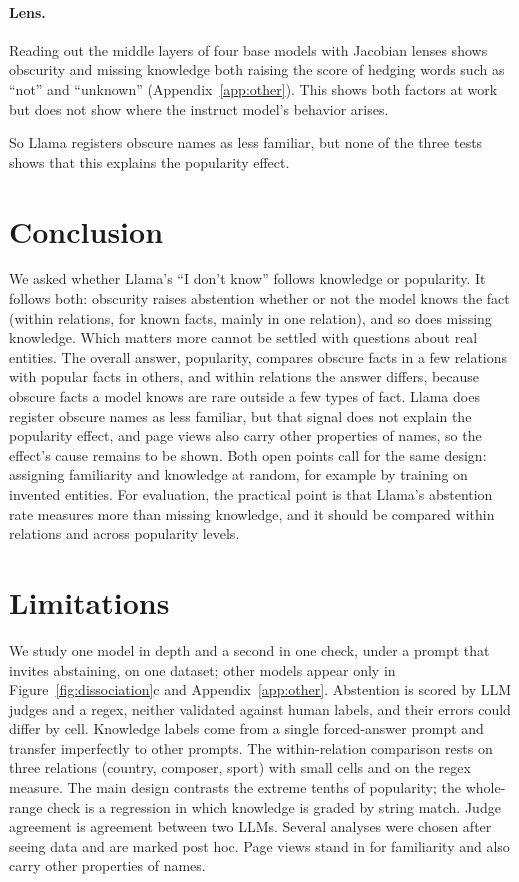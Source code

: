 \documentclass[11pt]{article}
\newcommand{\idk}{``I don't know''}
\begin{document}
\paragraph{Lens.} Reading out the middle layers of four base models with Jacobian lenses \citep{gurnee2026workspace} shows obscurity and missing knowledge both raising the score of hedging words such as ``not'' and ``unknown'' (Appendix~\ref{app:other}). This shows both factors at work but does not show where the instruct model's behavior arises.

So Llama registers obscure names as less familiar, but none of the three tests shows that this explains the popularity effect.

\section{Conclusion}

We asked whether Llama's \idk{} follows knowledge or popularity. It follows both: obscurity raises abstention whether or not the model knows the fact (within relations, for known facts, mainly in one relation), and so does missing knowledge. Which matters more cannot be settled with questions about real entities. The overall answer, popularity, compares obscure facts in a few relations with popular facts in others, and within relations the answer differs, because obscure facts a model knows are rare outside a few types of fact. Llama does register obscure names as less familiar, but that signal does not explain the popularity effect, and page views also carry other properties of names, so the effect's cause remains to be shown. Both open points call for the same design: assigning familiarity and knowledge at random, for example by training on invented entities. For evaluation, the practical point is that Llama's abstention rate measures more than missing knowledge, and it should be compared within relations and across popularity levels.

\section*{Limitations}

We study one model in depth and a second in one check, under a prompt that invites abstaining, on one dataset; other models appear only in Figure~\ref{fig:dissociation}c and Appendix~\ref{app:other}. Abstention is scored by LLM judges and a regex, neither validated against human labels, and their errors could differ by cell. Knowledge labels come from a single forced-answer prompt and transfer imperfectly to other prompts. The within-relation comparison rests on three relations (country, composer, sport) with small cells and on the regex measure. The main design contrasts the extreme tenths of popularity; the whole-range check is a regression in which knowledge is graded by string match. Judge agreement is agreement between two LLMs. Several analyses were chosen after seeing data and are marked post hoc. Page views stand in for familiarity and also carry other properties of names.
\end{document}

